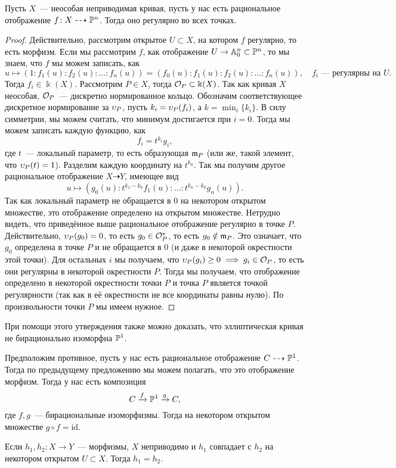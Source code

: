	
	\begin{statement} 
		Пусть $X$~--- неособая неприводимая кривая, пусть у нас есть рациональное отображение $f\colon X  \dashrightarrow \mathbb{P}^n$. Тогда оно регулярно во всех точках. 	
	\end{statement}
	\begin{proof}
		Действительно, рассмотрим открытое $U \subset X$, на котором $f$ регулярно, то есть морфизм. Если мы рассмотрим $f$, как отображение $U \to \mathbb{A}_{0}^n \subset \mathbb{P}^n$, то мы знаем, что $f$ мы можем записать, как 
		\[
			u \mapsto (1 : f_1(u) : f_2(u) : \ldots : f_n(u)) = (f_0(u) : f_1(u) : f_2(u) : \ldots : f_n(u)), \quad f_i \text{~--- регулярны на } U. 
		\]
		Тогда $f_i \in \Bbbk(X)$. Рассмотрим $P \in X$, тогда $\mathcal{O}_{P} \subset \Bbbk(X)$. Так как кривая $X$ неособая, $\mathcal{O}_{P}$~--- дискретно нормированное кольцо. Обозначим соответствующее дискретное нормирование за $\upsilon_{P}$, пусть $k_i = \upsilon_{P}(f_i)$, а $k = \min_{i}\{k_i\}$. В силу симметрии, мы можем считать, что минимум достигается при $i = 0$. Тогда мы можем записать каждую функцию, как 
		\[
			f_i = t^{k_i} g_{i},
		\]
		где $t$~--- локальный параметр, то есть образующая $\mathfrak{m}_{P}$ (или же, такой элемент, что $\upsilon_{P}(t) = 1$). Разделим каждую координату на $t^{k_0}$. Так мы получим другое рациональное отображение $X \dashrightarrow Y$, имеющее вид 
		\[
			u \mapsto (g_{0}(u) : t^{k_1 - k_0} f_1(u) : \ldots : t^{k_n - k_0} g_n(u)).
		\]
		Так как локальный параметр не обращается в 0 на некотором открытом множестве, это отображение определено на открытом множестве. Нетрудно видеть, что приведённое выше рациональное отображение регулярно в точке $P$. Действительно, $\upsilon_{P}(g_0) = 0$, то есть $g_0 \in \mathcal{O}_{P}^{*}$, то есть $g_0 \notin \mathfrak{m}_{P}$. Это означает, что $g_0$ определена в точке $P$ и не обращается в 0 (и даже в некоторой окрестности этой точки). Для остальных $i$ мы получаем, что $\upsilon_{P}(g_i) \ge 0 \implies g_i \in \mathcal{O}_{P}$, то есть они регулярны в некоторой окрестности $P$. Тогда мы получаем, что отображение определено в некоторой окрестности точки $P$ и точка $P$ является точкой регулярности (так как в её окрестности не все координаты равны нулю). По произвольности точки $P$ мы имеем нужное. 
		
	\end{proof}

	При помощи этого утверждения также можно доказать, что эллиптическая кривая не бирационально изоморфна $\mathbb{P}^1$.

	Предположим противное, пусть у нас есть рациональное отображение $C \dashrightarrow \mathbb{P}^1$. Тогда по предыдущему предложению мы можем полагать, что это отображение морфизм. Тогда у нас есть композиция 
	\[
		C \xrightarrow{f} \mathbb{P}^1 \xrightarrow{g} C,
	\]
	где $f, g$~--- бирациональные изоморфизмы. Тогда на некотором открытом множестве $g \circ f = \mathrm{id}$. 
	\begin{lemma} 
	 	Если $h_1, h_2\colon X \to Y$~--- морфизмы, $X$ неприводимо и $h_1$ совпадает с $h_2$ на некотором открытом $U \subset X$. Тогда $h_1 = h_2$.
	 \end{lemma} 

